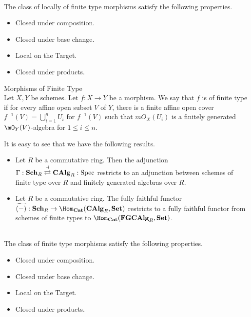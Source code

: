 \documentclass[a4paper]{article}
\begin{document}
\begin{lmm}{}{}\\
The class of locally of finite type morphisms satisfy the following properties. 
\begin{itemize}
\item Closed under composition. 
\item Closed under base change. 
\item Local on the Target. 
\item Closed under products. 
\end{itemize}
\end{lmm}

\begin{defn}{Morphisms of Finite Type}{}\\
Let $X,Y$ be schemes. Let $f:X\to Y$ be a morphism. We say that $f$ is of finite type if for every affine open subset $V$ of $Y$, there is a finite affine open cover $f^{-1}(V)=\bigcup_{i=1}^nU_i$ for $f^{-1}(V)$ such that $mO_X(U_i)$ is a finitely generated $\mO_Y(V)$-algebra for $1\leq i\leq n$. 
\end{defn}

It is easy to see that we have the following results. 
\begin{itemize}
\item Let $R$ be a commutative ring. Then the adjunction $\Gamma:\bold{Sch}_R\overset{\dashv}{\rightleftarrows}\bold{CAlg}_R:\text{Spec}$ restricts to an adjunction between schemes of finite type over $R$ and finitely generated algebras over $R$. 
\item Let $R$ be a commutative ring. The fully faithful functor $\widetilde{(-)}:\bold{Sch}_R\to\Hom_{\bold{Cat}}(\bold{CAlg}_R,\bold{Set})$ restricts to a fully faithful functor from schemes of finite types to $\Hom_{\bold{Cat}}(\bold{FGCAlg}_R,\bold{Set})$. 
\end{itemize}

\begin{lmm}{}{}\\
The class of finite type morphisms satisfy the following properties. 
\begin{itemize}
\item Closed under composition. 
\item Closed under base change. 
\item Local on the Target. 
\item Closed under products. 
\end{itemize}
\end{lmm}
\end{document}
